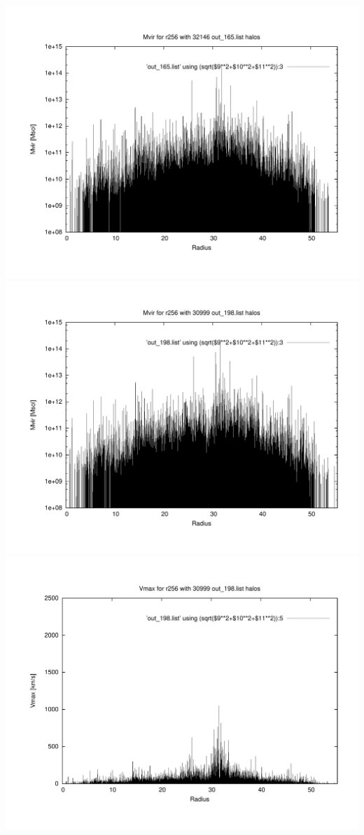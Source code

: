 \includegraphics[scale=0.3]{r256/stages14_ling/plot_mvir_out_165.pdf}
\includegraphics[scale=0.3]{r256/stages14_ling/plot_mvir_out_198.pdf}
\includegraphics[scale=0.3]{r256/stages14_ling/plot_Vmax_out_198.pdf}

